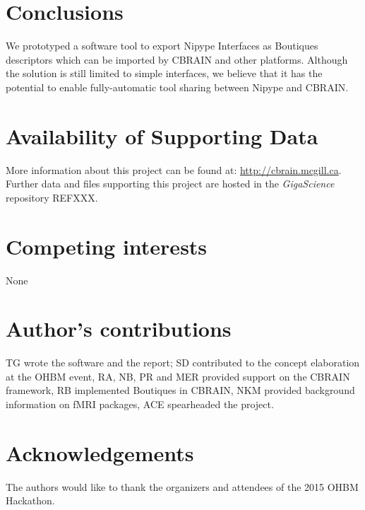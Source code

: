 \documentclass[twocolumn]{bmcart}%
\begin{document}
\section{Conclusions}\label{conclusions}

We prototyped a software tool to export Nipype Interfaces as Boutiques
descriptors which can be imported by CBRAIN and other platforms.
Although the solution is still limited to simple interfaces, we believe
that it has the potential to enable fully-automatic tool sharing between
Nipype and CBRAIN.


\begin{backmatter}

\section*{Availability of Supporting Data}
More information about this project can be found at: \url{http://cbrain.mcgill.ca}. Further data and files supporting this project are hosted in the \emph{GigaScience} repository REFXXX.

\section*{Competing interests}
None

\section*{Author's contributions}
TG wrote the software and the report; SD contributed to the concept
elaboration at the OHBM event, RA, NB, PR and MER provided support on
the CBRAIN framework, RB implemented Boutiques in CBRAIN, NKM provided
background information on fMRI packages, ACE spearheaded the project.

\section*{Acknowledgements}
The authors would like to thank the organizers and attendees of the 2015
OHBM Hackathon.

  
  

\end{backmatter}
\end{document}
